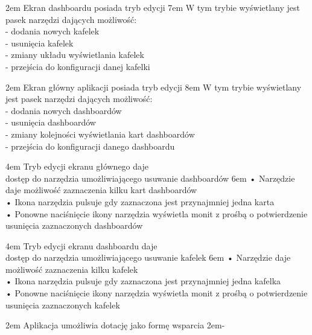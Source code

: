 {2em}{
    Ekran dashboardu posiada tryb edycji
}
{7em}{
    W tym trybie wyświetlany jest pasek narzędzi dających możliwość:\\
    - dodania nowych kafelek\\
    - usunięcia kafelek\\
    - zmiany układu wyświetlania kafelek\\
    - przejścia do konfiguracji danej kafelki
}

{2em}{
    Ekran główny aplikacji posiada tryb edycji
}
{8em}{
    W tym trybie wyświetlany jest pasek narzędzi dających możliwość:\\
    - dodania nowych dashboardów\\
    - usunięcia dashboardów\\
    - zmiany kolejności wyświetlania kart dashboardów\\
    - przejścia do konfiguracji danego dashboardu
}

{4em}{
    Tryb edycji ekranu głównego daje\\
    dostęp do narzędzia umożliwiającego usuwanie dashboardów
}
{6em}{
    • Narzędzie daje możliwość zaznaczenia kilku kart dashboardów\\
    • Ikona narzędzia pulsuje gdy zaznaczona jest przynajmniej jedna karta\\
    • Ponowne naciśnięcie ikony narzędzia wyświetla monit z prośbą o potwierdzenie\\
    \hspace*{0.5em} usunięcia zaznaczonych dashboardów
}

{4em}{
    Tryb edycji ekranu dashboardu daje\\
    dostęp do narzędzia umożliwiającego usuwanie kafelek
}
{6em}{
    • Narzędzie daje możliwość zaznaczenia kilku kafelek\\
    • Ikona narzędzia pulsuje gdy zaznaczona jest przynajmniej jedna kafelka\\
    • Ponowne naciśnięcie ikony narzędzia wyświetla monit z prośbą o potwierdzenie\\
    \hspace*{0.5em} usunięcia zaznaczonych kafelek
}

{2em}{
    Aplikacja umożliwia dotację jako formę wsparcia
}
{2em}{-}

